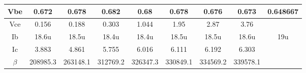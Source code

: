 \begin{table}[h]
\begin{tabular}{|ccccccccc|}
\multicolumn{1}{|c|}{Vbe}     & \multicolumn{1}{c|}{0.672}    & \multicolumn{1}{c|}{0.678}    & \multicolumn{1}{c|}{0.682}    & \multicolumn{1}{c|}{0.68}     & \multicolumn{1}{c|}{0.678}    & \multicolumn{1}{c|}{0.676}    & \multicolumn{1}{c|}{0.673}    & 0.648667 \\ \hline
\multicolumn{1}{|c|}{Vce}     & \multicolumn{1}{c|}{0.156}    & \multicolumn{1}{c|}{0.188}    & \multicolumn{1}{c|}{0.303}    & \multicolumn{1}{c|}{1.044}    & \multicolumn{1}{c|}{1.95}     & \multicolumn{1}{c|}{2.87}     & \multicolumn{1}{c|}{3.76}     &          \\ \hline
\multicolumn{1}{|c|}{Ib}      & \multicolumn{1}{c|}{18.6u}    & \multicolumn{1}{c|}{18.5u}    & \multicolumn{1}{c|}{18.4u}    & \multicolumn{1}{c|}{18.4u}    & \multicolumn{1}{c|}{18.5u}    & \multicolumn{1}{c|}{18.5u}    & \multicolumn{1}{c|}{18.6u}    & 19u      \\ \hline
\multicolumn{1}{|c|}{Ic}      & \multicolumn{1}{c|}{3.883}    & \multicolumn{1}{c|}{4.861}    & \multicolumn{1}{c|}{5.755}    & \multicolumn{1}{c|}{6.016}    & \multicolumn{1}{c|}{6.111}    & \multicolumn{1}{c|}{6.192}    & \multicolumn{1}{c|}{6.303}    &          \\ \hline
\multicolumn{1}{|c|}{$\beta$} & \multicolumn{1}{c|}{208985.3} & \multicolumn{1}{c|}{263148.1} & \multicolumn{1}{c|}{312769.2} & \multicolumn{1}{c|}{326347.3} & \multicolumn{1}{c|}{330849.1} & \multicolumn{1}{c|}{334569.2} & \multicolumn{1}{c|}{339578.1} &          \\ \hline
\end{tabular}
\end{table}
\FloatBarrier
